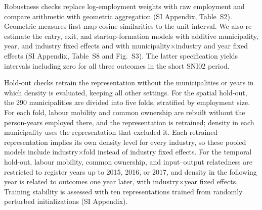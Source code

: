 \documentclass[9pt,twocolumn,twoside]{pnas-new}
\begin{document}
Robustness checks replace log-employment weights with raw employment and compare arithmetic with geometric aggregation (SI Appendix, Table~S2). Geometric measures first map cosine similarities to the unit interval. We also re-estimate the entry, exit, and startup-formation models with additive municipality, year, and industry fixed effects and with municipality$\times$industry and year fixed effects (SI Appendix, Table~S8 and Fig.~S3). The latter specification yields intervals including zero for all three outcomes in the short SNI02 period.

Hold-out checks retrain the representation without the municipalities or years in which density is evaluated, keeping all other settings. For the spatial hold-out, the 290 municipalities are divided into five folds, stratified by employment size. For each fold, labour mobility and common ownership are rebuilt without the person-years employed there, and the representation is retrained; density in each municipality uses the representation that excluded it. Each retrained representation implies its own density level for every industry, so these pooled models include industry$\times$fold instead of industry fixed effects. For the temporal hold-out, labour mobility, common ownership, and input--output relatedness are restricted to register years up to 2015, 2016, or 2017, and density in the following year is related to outcomes one year later, with industry$\times$year fixed effects. Training stability is assessed with ten representations trained from randomly perturbed initializations (SI Appendix).
\end{document}
